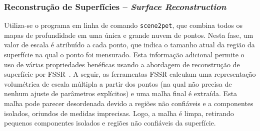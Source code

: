 \subsubsection{Reconstrução de Superfícies -- \emph{Surface Reconstruction}}

Utiliza-se o programa em linha de comando \texttt{scene2pet}, que combina todos os mapas de
profundidade em uma única e grande nuvem de pontos. Nesta fase, um valor de
escala é atribuído a cada ponto, que indica o tamanho atual da região da
superfície na qual o ponto foi mensurado. Esta informação adicional permite o
uso de várias propriedades benéficas usando a abordagem de reconstrução de
superfície por FSSR~\cite{fuhrmann2014floating}.  A seguir, as ferramentas
FSSR calculam uma representação volumétrica de escala múltipla a partir dos
pontos (na qual não precisa de nenhum ajuste de parâmetros explícitos) e uma
malha final é extraída. Esta malha pode parecer desordenada devido a regiões não
confiáveis e a componentes isolados, oriundos de medidas imprecisas. Logo, a
malha é limpa, retirando pequenos componentes isolados e regiões não confiáveis
da superfície. 





